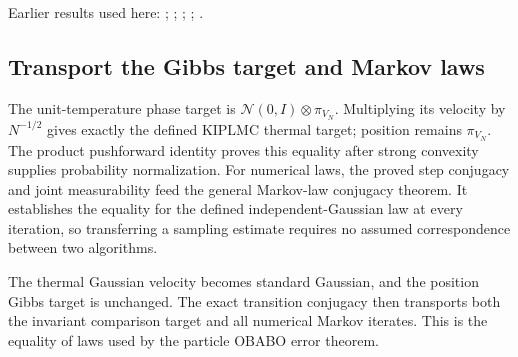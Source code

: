 \documentclass[11pt,a4paper]{report}
\begin{document}
Earlier results used here: \cite[Section~3.20.1]{LangevinLean2026ULASC}; \cite[Section~3.20.3]{LangevinLean2026ULASC}; \cite[Section~3.1.1]{LangevinLean2026IPLA}; \cite[Section~3.20.1]{LangevinLean2026Kinetic}; \cite[Section~3.20.5]{LangevinLean2026Kinetic}.
\subsection{\texorpdfstring{Transport the Gibbs target and Markov laws}{Transport the Gibbs target and Markov laws}}
\label{report-step-KIPLMC-OBABORescaling-lean-4}


The unit-temperature phase target is \(\mathcal N(0,I)\otimes\pi_{V_N}\). Multiplying its velocity by \(N^{-1/2}\) gives exactly the defined KIPLMC thermal target; position remains \(\pi_{V_N}\). The product pushforward identity proves this equality after strong convexity supplies probability normalization. For numerical laws, the proved step conjugacy and joint measurability feed the general Markov-law conjugacy theorem. It establishes the equality for the defined independent-Gaussian law at every iteration, so transferring a sampling estimate requires no assumed correspondence between two algorithms.



The thermal Gaussian velocity becomes standard Gaussian, and the position Gibbs target is unchanged. The exact transition conjugacy then transports both the invariant comparison target and all numerical Markov iterates. This is the equality of laws used by the particle OBABO error theorem.
\end{document}
